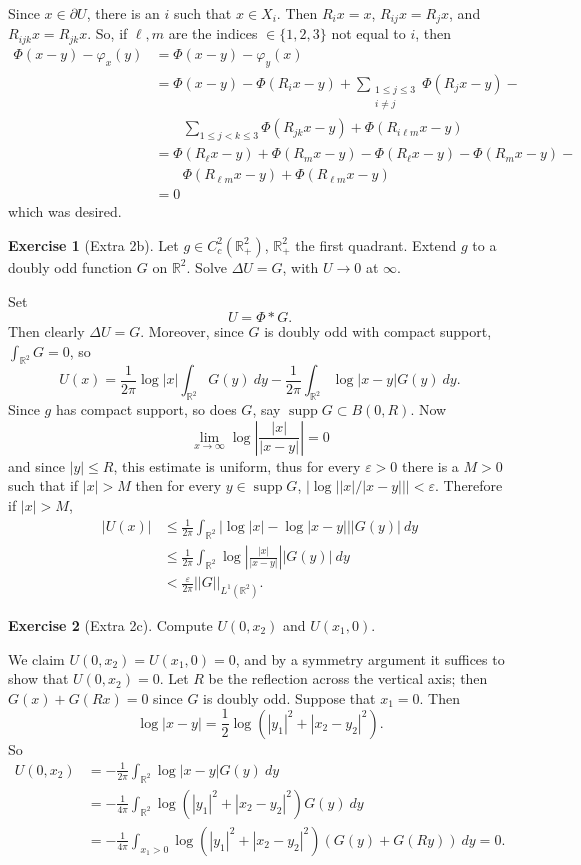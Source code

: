 \documentclass[10pt]{article}
\newcommand{\RR}{\mathbb{R}}
\newcommand{\supp}{\operatorname{supp}}
\theoremstyle{definition}
\newtheorem{exer}{Exercise}
\begin{document}
Since $x \in \partial U$, there is an $i$ such that $x \in X_i$.
Then $R_ix = x$, $R_{ij}x = R_jx$, and $R_{ijk}x = R_{jk}x$.
So, if $\ell,m$ are the indices $\in \{1, 2, 3\}$ not equal to $i$, then
\begin{align*}
\Phi(x - y) - \varphi_x(y) &= \Phi(x - y) - \varphi_y(x)\\
&= \Phi(x - y) - \Phi(R_ix - y) + \sum_{\substack{1\leq j \leq 3\\ i \neq j}} \Phi(R_jx - y) - \\
&\qquad\sum_{1 \leq j < k \leq 3} \Phi(R_{jk}x - y) + \Phi(R_{i\ell m}x - y)\\
&= \Phi(R_\ell x - y) + \Phi(R_m x - y) - \Phi(R_\ell x - y) - \Phi(R_m x - y) -
\\&\qquad \Phi(R_{\ell m} x - y) + \Phi(R_{\ell m}x - y)\\
&= 0
\end{align*}
which was desired.

\begin{exer}[Extra 2b]
Let $g \in C^2_c(\RR_+^2)$, $\RR^2_+$ the first quadrant. Extend $g$ to a doubly odd function $G$ on $\RR^2$. Solve $\Delta U = G$, with $U \to 0$ at $\infty$.
\end{exer}

Set
$$U = \Phi * G.$$
Then clearly $\Delta U = G$.
Moreover, since $G$ is doubly odd with compact support, $\int_{\RR^2} G = 0$, so
$$U(x) = \frac{1}{2\pi} \log |x| \int_{\RR^2} G(y)~dy - \frac{1}{2\pi} \int_{\RR^2} \log|x - y| G(y)~dy.$$
Since $g$ has compact support, so does $G$, say $\supp G \subset B(0, R)$.
Now
$$\lim_{x \to \infty} \log\left|\frac{|x|}{|x-y|}\right| = 0$$
and since $|y| \leq R$, this estimate is uniform, thus for every $\varepsilon > 0$ there is a $M> 0$ such that if $|x| > M$ then for every $y \in \supp G$, $\left|\log\left||x|/|x-y|\right|\right| < \varepsilon$. Therefore if $|x| > M$,
\begin{align*}
|U(x)| &\leq \frac{1}{2\pi} \int_{\RR^2} \left|\log|x| - \log|x-y|\right| |G(y)| ~dy\\
&\leq \frac{1}{2\pi} \int_{\RR^2} \log\left|\frac{|x|}{|x-y|}\right| |G(y)| ~dy\\
&< \frac{\varepsilon}{2\pi} ||G||_{L^1(\RR^2)}.
\end{align*}

\begin{exer}[Extra 2c]
Compute $U(0, x_2)$ and $U(x_1, 0)$.
\end{exer}

We claim $U(0, x_2) = U(x_1, 0) = 0$, and by a symmetry argument it suffices to show that $U(0, x_2) = 0$.
Let $R$ be the reflection across the vertical axis; then $G(x) + G(Rx) = 0$ since $G$ is doubly odd.
Suppose that $x_1 = 0$. Then
$$\log |x - y| = \frac{1}{2} \log\left(|y_1|^2 + |x_2 - y_2|^2\right).$$
So
\begin{align*}
U(0, x_2) &= -\frac{1}{2\pi} \int_{\RR^2} \log|x-y| G(y)~dy
\\&= -\frac{1}{4\pi} \int_{\RR^2} \log\left(|y_1|^2 + |x_2 - y_2|^2\right) G(y)~dy
\\&= -\frac{1}{4\pi} \int_{x_1 > 0} \log\left(|y_1|^2 + |x_2 - y_2|^2\right) (G(y) + G(Ry)) ~dy = 0.
\end{align*}
\end{document}
